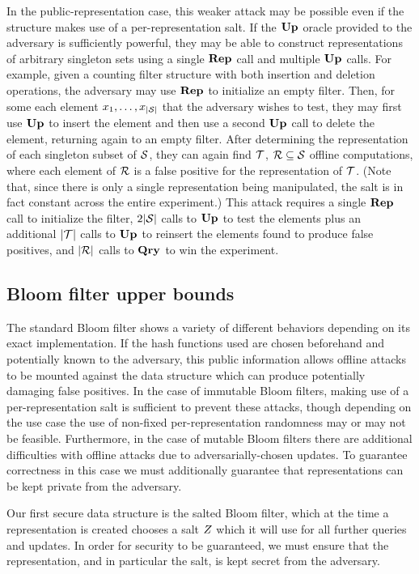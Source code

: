 In the public-representation case, this weaker attack may be possible even if the structure makes use of a per-representation salt. If the $\mathbf{Up}\hspace{0.5pt}$ oracle provided to the adversary is sufficiently powerful, they may be able to construct representations of arbitrary singleton sets using a single $\mathbf{Rep}\hspace{0.5pt}$ call and multiple $\mathbf{Up}\hspace{0.5pt}$ calls. For example, given a counting filter structure with both insertion and deletion operations, the adversary may use $\mathbf{Rep}\hspace{0.5pt}$ to initialize an empty filter. Then, for some each element $x_1, \ldots, x_{|\mathcal{S}|}$ that the adversary wishes to test, they may first use $\mathbf{Up}\hspace{0.5pt}$ to insert the element and then use a second $\mathbf{Up}\hspace{0.5pt}$ call to delete the element, returning again to an empty filter. After determining the representation of each singleton subset of $\mathcal{S}$, they can again find $\mathcal{T}$, $\mathcal{R} \subseteq \mathcal{S}$ offline computations, where each element of $\mathcal{R}$ is a false positive for the representation of $\mathcal{T}$. (Note that, since there is only a single representation being manipulated, the salt is in fact constant across the entire experiment.) This attack requires a single $\mathbf{Rep}\hspace{0.5pt}$ call to initialize the filter, $2|\mathcal{S}|$ calls to $\mathbf{Up}\hspace{0.5pt}$ to test the elements plus an additional $|\mathcal{T}|$ calls to $\mathbf{Up}\hspace{0.5pt}$ to reinsert the elements found to produce false positives, and $|\mathcal{R}|$ calls to $\mathbf{Qry}\hspace{0.5pt}$ to win the experiment.

\subsection{Bloom filter upper bounds}

The standard Bloom filter shows a variety of different behaviors depending on its exact implementation. If the hash functions used are chosen beforehand and potentially known to the adversary, this public information allows offline attacks to be mounted against the data structure which can produce potentially damaging false positives. In the case of immutable Bloom filters, making use of a per-representation salt is sufficient to prevent these attacks, though depending on the use case the use of non-fixed per-representation randomness may or may not be feasible. Furthermore, in the case of mutable Bloom filters there are additional difficulties with offline attacks due to adversarially-chosen updates. To guarantee correctness in this case we must additionally guarantee that representations can be kept private from the adversary.

Our first secure data structure is the salted Bloom filter, which at the time a representation is created chooses a salt $Z$ which it will use for all further queries and updates. In order for security to be guaranteed, we must ensure that the representation, and in particular the salt, is kept secret from the adversary.

